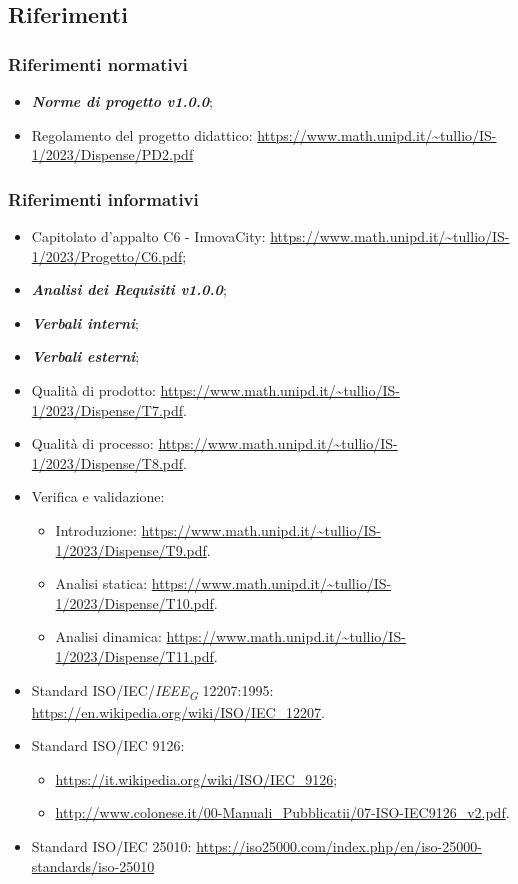 \subsection{Riferimenti}
\subsubsection{Riferimenti normativi}
\begin{itemize}
    \item \textbf{\textit{Norme di progetto v1.0.0}};
    \item Regolamento del progetto didattico: \url{https://www.math.unipd.it/~tullio/IS-1/2023/Dispense/PD2.pdf}
\end{itemize}
\subsubsection{Riferimenti informativi}
\begin{itemize}
    \item Capitolato d’appalto C6 - InnovaCity: \url{https://www.math.unipd.it/~tullio/IS-1/2023/Progetto/C6.pdf};
    \item \textbf{\textit{Analisi dei Requisiti v1.0.0}};
    \item \textbf{\textit{Verbali interni}};
    \item \textbf{\textit{Verbali esterni}};
    \item Qualità di prodotto: \url{https://www.math.unipd.it/~tullio/IS-1/2023/Dispense/T7.pdf}.
    \item Qualità di processo: \url{https://www.math.unipd.it/~tullio/IS-1/2023/Dispense/T8.pdf}.
    \item Verifica e validazione: \begin{itemize}
    \item Introduzione: \url{https://www.math.unipd.it/~tullio/IS-1/2023/Dispense/T9.pdf}.
    \item Analisi statica: \url{https://www.math.unipd.it/~tullio/IS-1/2023/Dispense/T10.pdf}.
    \item Analisi dinamica: \url{https://www.math.unipd.it/~tullio/IS-1/2023/Dispense/T11.pdf}.
    \end{itemize}
    \item Standard ISO/IEC/\textit{IEEE}\textsubscript{\textit{G}} 12207:1995: \url{https://en.wikipedia.org/wiki/ISO/IEC_12207}.
    \item Standard ISO/IEC 9126: \begin{itemize}
        \item \url{https://it.wikipedia.org/wiki/ISO/IEC_9126};
        \item \url{http://www.colonese.it/00-Manuali_Pubblicatii/07-ISO-IEC9126_v2.pdf}.
    \end{itemize}
    \item Standard ISO/IEC 25010: \url{https://iso25000.com/index.php/en/iso-25000-standards/iso-25010}
\end{itemize}
